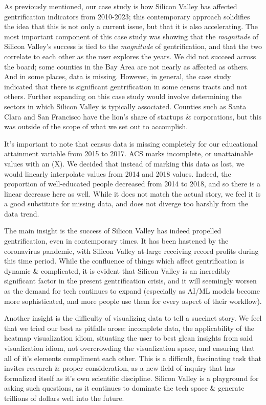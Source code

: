 \documentclass{article}
\begin{document}
    As previously mentioned, our case study is how Silicon Valley has affected gentrification indicators from 2010-2023; this contemporary approach solidifies the idea that this is not only a current issue, but that it is also accelerating. The most important component of this case study was showing that the \textit{magnitude} of Silicon Valley's success is tied to the \textit{magnitude} of gentrification, and that the two correlate to each other as the user explores the years. We did not succeed across the board; some counties in the Bay Area are not nearly as affected as others. And in some places, data is missing. However, in general, the case study indicated that there is significant gentrification in some census tracts and not others. Further expanding on this case study would involve determining the sectors in which Silicon Valley is typically associated. Counties such as Santa Clara and San Francisco have the lion's share of startups \& corporations, but this was outside of the scope of what we set out to accomplish.
    
    It's important to note that census data is missing completely for our educational attainment variable from 2015 to 2017. ACS marks incomplete, or unattainable values with an (X). We decided that instead of marking this data as lost, we would linearly interpolate values from 2014 and 2018 values. Indeed, the proportion of well-educated people decreased from 2014 to 2018, and so there is a linear decrease here as well. While it does not match the actual story, we feel it is a good substitute for missing data, and does not diverge too harshly from the data trend.
    
    The main insight is the success of Silicon Valley has indeed propelled gentrification, even in contemporary times. It has been hastened by the coronavirus pandemic, with Silicon Valley at-large receiving record profits during this time period. While the confluence of things which affect gentrification is dynamic \& complicated, it is evident that Silicon Valley is an incredibly significant factor in the present gentrification crisis, and it will seemingly worsen as the demand for tech continues to expand (especially as AI/ML models become more sophisticated, and more people use them for every aspect of their workflow). 

    Another insight is the difficulty of visualizing data to tell a succinct story. We feel that we tried our best as pitfalls arose: incomplete data, the applicability of the heatmap visualization idiom, situating the user to best glean insights from said visualization idiom, not overcrowding the visualization space, and ensuring that all of it's elements compliment each other. This is a difficult, fascinating task that invites research \& proper consideration, as a new field of inquiry that has formalized itself as it's own scientific discipline. Silicon Valley is a playground for asking such questions, as it continues to dominate the tech space \& generate trillions of dollars well into the future.
\end{document}
